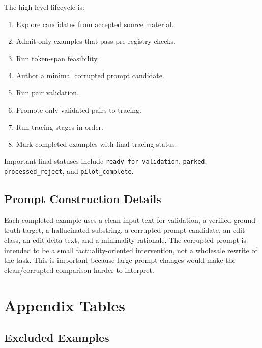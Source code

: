 \documentclass[11pt]{article}
\begin{document}
The high-level lifecycle is:
\begin{enumerate}
    \item Explore candidates from accepted source material.
    \item Admit only examples that pass pre-registry checks.
    \item Run token-span feasibility.
    \item Author a minimal corrupted prompt candidate.
    \item Run pair validation.
    \item Promote only validated pairs to tracing.
    \item Run tracing stages in order.
    \item Mark completed examples with final tracing status.
\end{enumerate}

Important final statuses include \texttt{ready\_for\_validation}, \texttt{parked}, \texttt{processed\_reject}, and \texttt{pilot\_complete}.

\subsection{Prompt Construction Details}
\label{app:prompts}

Each completed example uses a clean input text for validation, a verified ground-truth target, a hallucinated substring, a corrupted prompt candidate, an edit class, an edit delta text, and a minimality rationale. The corrupted prompt is intended to be a small factuality-oriented intervention, not a wholesale rewrite of the task. This is important because large prompt changes would make the clean/corrupted comparison harder to interpret.


\section{Appendix Tables}
\label{app:tables}
\setlength{\abovecaptionskip}{2pt}
\setlength{\belowcaptionskip}{2pt}

\subsection{Excluded Examples}
\label{app:excluded}
\end{document}
